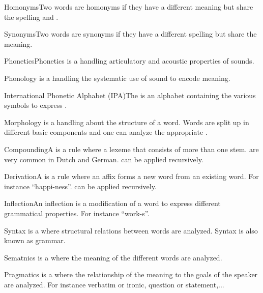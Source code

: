 \documentclass{article}
\begin{document}
\begin{df}{Homonyms}Two words are homonyms if they have a different meaning but share the spelling and \pnc{}.
\end{df}
\begin{df}{Synonyms}Two words are synonyms if they have a different spelling but share the meaning.
\end{df}
\begin{df}{Phonetics}Phonetics is a \alnlp{} handling articulatory and acoustic properties of sounds.
\end{df}
\begin{df}{Phonology}\sb{} is a \alnlp{} handling the systematic use of sound to encode meaning.
\end{df}
\begin{df}{International Phonetic Alphabet (IPA)}The \sb{} is an alphabet containing the various symbols to express \pnc{}.
\end{df}
\begin{df}{Morphology}\sb{} is a \alnlp{} handling about the structure of a word. Words are split up in different basic components and one can analyze the appropriate \pos{}.
\end{df}
\begin{df}{Compounding}A \sb{} is a \mpcl{} rule where a lexeme that consists of more than one stem. \sb{} are very common in Dutch and German. \sb{} can be applied recursively.
\end{df}
\begin{df}{Derivation}A \sb{} is a \mpcl{} rule where an affix forms a new word from an existing word. For instance ``happi-ness''. \sb{} can be applied recursively.
\end{df}
\begin{df}{Inflection}An inflection is a modification of a word to express different grammatical properties. For instance ``work-s''.
\end{df}
\begin{df}{Syntax}\sb{} is a \alnlp{} where structural relations between words are analyzed. Syntax is also known as grammar.
\end{df}
\begin{df}{Sematnics}\sb{} is a \alnlp{} where the meaning of the different words are analyzed.
\end{df}
\begin{df}{Pragmatics}\sb{} is a \alnlp{} where the relationship of the meaning to the goals of the speaker are analyzed. For instance verbatim or ironic, question or statement,...
\end{df}
\end{document}
